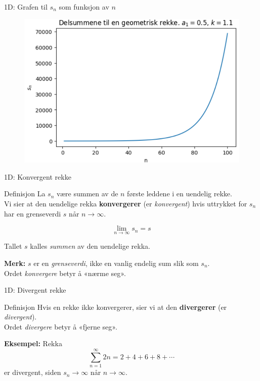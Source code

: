 \cyanheader
\begin{frame}[fragile]{1D:  Grafen til $s_n$ som funksjon av $n$}
\begin{figure}
    \centering
    \includegraphics[width=0.7\linewidth]{R2K1D-6.png}
\end{figure}
\end{frame}

\blueheader
\begin{frame}{1D: Konvergent rekke}

\begin{blue*}{Definisjon}
La $s_n$ være summen av de $n$ første leddene i en uendelig rekke.  \\


Vi sier at den uendelige rekka \textbf{konvergerer} (er \emph{konvergent}) hvis uttrykket for $s_n$ har en grenseverdi $s$ når $n \to \infty$.  

\[
\lim_{n \to \infty} s_n = s
\]

Tallet $s$ kalles \emph{summen} av den uendelige rekka.  

\medskip
\textbf{Merk:} $s$ er en \emph{grenseverdi}, ikke en vanlig endelig sum slik som $s_n$.\\


Ordet \emph{konvergere} betyr å «nærme seg».
\end{blue*}
\end{frame}

\blueheader
\begin{frame}{1D: Divergent rekke}

\begin{blue*}{Definisjon}
Hvis en rekke ikke konvergerer, sier vi at den \textbf{divergerer} (er \emph{divergent}). \\


Ordet \emph{divergere} betyr å «fjerne seg».  

\medskip
\textbf{Eksempel:} Rekka
\[
\sum_{n=1}^{\infty} 2n = 2 + 4 + 6 + 8 + \cdots
\]
er divergent, siden $s_n \to \infty$ når $n \to \infty$.
\end{blue*}
\end{frame}

